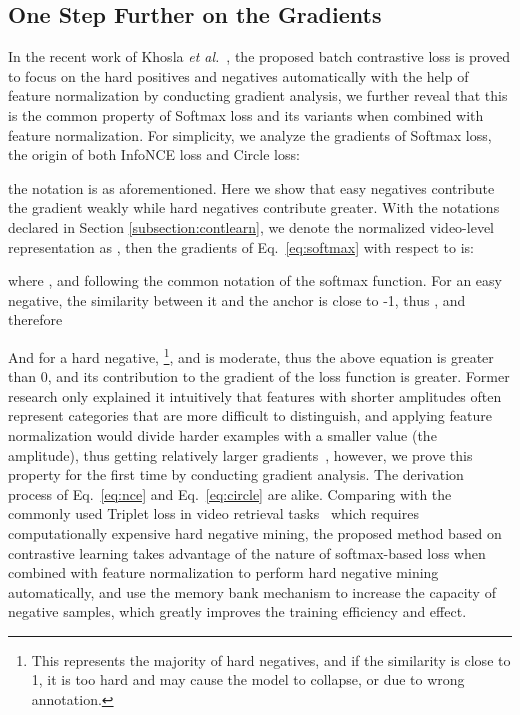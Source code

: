 \documentclass[10pt,twocolumn,letterpaper]{article}
\begin{document}
\subsection{One Step Further on the Gradients} \label{subsection:onestepfurther}
In the recent work of Khosla \textit{et al.}~\cite{Khosla2020SupervisedCL}, the proposed batch contrastive loss is proved to focus on the hard positives and negatives automatically with the help of feature normalization by conducting gradient analysis, we further reveal that this is the common property of Softmax loss and its variants when combined with feature normalization. For simplicity, we analyze the gradients of Softmax loss, the origin of both InfoNCE loss and Circle loss:
{\small

}
the notation is as aforementioned. Here we show that easy negatives contribute the gradient weakly while hard negatives contribute greater. With the notations declared in Section \ref{subsection:contlearn}, we denote the normalized video-level representation as , then the gradients of Eq.~\ref{eq:softmax} with respect to  is:
{\small

}
where , and  following the common notation of the softmax function. For an easy negative, the similarity between it and the anchor is close to -1, thus , and therefore
{\small

}
And for a hard negative, \footnote{This represents the majority of hard negatives, and if the similarity is close to 1, it is too hard and may cause the model to collapse, or due to wrong annotation.}, and  is moderate, thus the above equation is greater than 0, and its contribution to the gradient of the loss function is greater. Former research only explained it intuitively that features with shorter amplitudes often represent categories that are more difficult to distinguish, and applying feature normalization would divide harder examples with a smaller value (the amplitude), thus getting relatively larger gradients~\cite{feng2018research}, however, we prove this property for the first time by conducting gradient analysis. The derivation process of Eq.~\ref{eq:nce} and Eq.~\ref{eq:circle} are alike. Comparing with the commonly used Triplet loss in video retrieval tasks~\cite{kordopatis2017dml,kordopatis2019visil} which requires computationally expensive hard negative mining, the proposed method based on contrastive learning takes advantage of the nature of softmax-based loss when combined with feature normalization to perform hard negative mining automatically, and use the memory bank mechanism to increase the capacity of negative samples, which greatly improves the training efficiency and effect.
\end{document}
